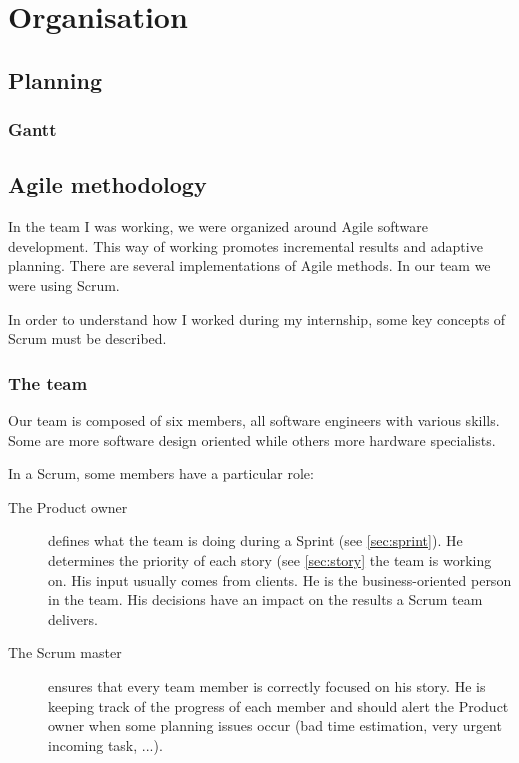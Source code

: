 \chapter{Organisation}

\section{Planning}
\subsection{Gantt}
%

\section{Agile methodology}

In the team I was working, we were organized around Agile software
development. This way of working promotes incremental results and adaptive planning.
There are several implementations of Agile methods. In our team we were using Scrum.

In order to understand how I worked during my internship, some key concepts of Scrum must be described.

\subsection{The team}
Our team is composed of six members, all software engineers with various
skills. Some are more software design oriented while others more hardware
specialists.

In a Scrum, some members have a particular role:
\begin{description}
    \item[The Product owner]
        defines what the team is doing during a Sprint (see \ref{sec:sprint}).
        He determines the priority of each story (see \ref{sec:story} the team is working on. His input usually comes from
        clients. He is the business-oriented person in the team. His decisions have an impact on the results a Scrum team delivers.
    \item[The Scrum master]
        ensures that every team member is correctly focused on his story. He is keeping track of the progress of each member and
        should alert the Product owner when some planning issues occur (bad time estimation, very urgent incoming task, ...).
\end{description}

